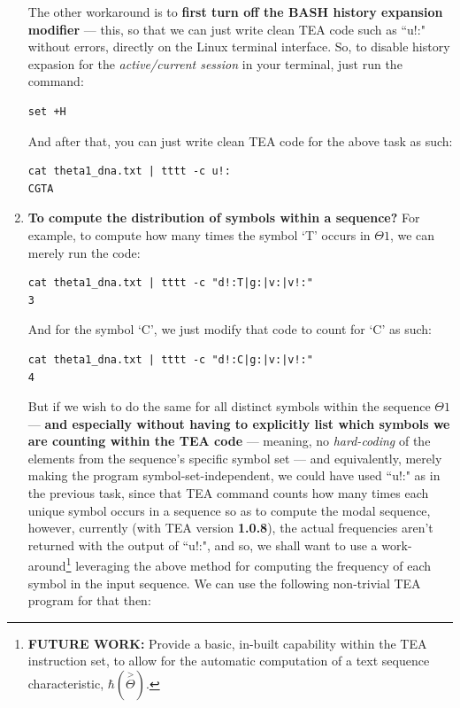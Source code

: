 \documentclass[a4paper, 18pt]{book} %
\begin{document}
\begin{enumerate}
{The other workaround is to \textbf{first turn off the BASH history expansion modifier} --- this, so that we can just write clean TEA code such as ``u!:" without errors, directly on the Linux terminal interface. So, to disable history expasion for the \textit{active/current session} in your terminal, just run the command:

\begin{verbatim}
set +H
\end{verbatim}

And after that, you can just write clean TEA code for the above task as such:
\begin{verbatim}
cat theta1_dna.txt | tttt -c u!:
CGTA
\end{verbatim}
}
\item {\textbf{To compute the distribution of symbols within a sequence?} For example, to compute how many times the symbol `T' occurs in $\Theta1$, we can merely run the code:

\begin{verbatim}
cat theta1_dna.txt | tttt -c "d!:T|g:|v:|v!:"
3
\end{verbatim}
And for the symbol `C', we just modify that code to count for `C' as such:


\begin{verbatim}
cat theta1_dna.txt | tttt -c "d!:C|g:|v:|v!:"
4
\end{verbatim}

But if we wish to do the same for all distinct symbols within the sequence $\Theta1$ --- \textbf{and especially without having to explicitly list which symbols we are counting within the TEA code} --- meaning, no \textit{hard-coding} of the elements from the sequence's specific symbol set --- and equivalently, merely making the program symbol-set-independent, we could have used ``u!:" as in the previous task, since that TEA command counts how many times each unique symbol occurs in a sequence so as to compute the modal sequence, however, currently (with TEA version \textbf{1.0.8}\cite{cli_tttt}), the actual frequencies aren't returned with the output of ``u!:", and so, we shall want to use a work-around\footnote{\textbf{FUTURE WORK:} Provide a basic, in-built capability within the TEA instruction set, to allow for the automatic computation of a text sequence characteristic, $\hbar(\overset{>}{\Theta})$.} leveraging the above method for computing the frequency of each symbol in the input sequence. We can use the following non-trivial TEA program for that then:

}
\end{enumerate}
\end{document}
